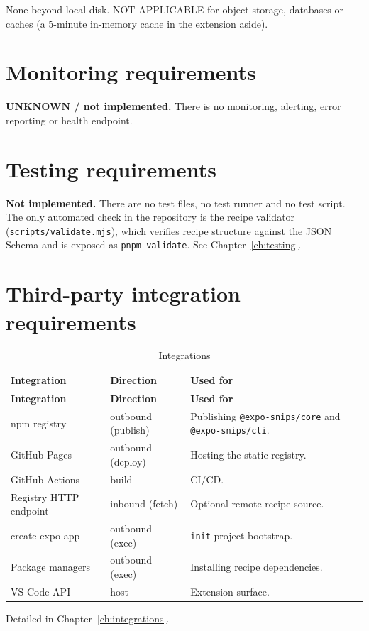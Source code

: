 None beyond local disk. NOT APPLICABLE for object storage, databases or caches
(a 5-minute in-memory cache in the extension aside).

\section{Monitoring requirements}

\textbf{UNKNOWN / not implemented.} There is no monitoring, alerting, error
reporting or health endpoint.

\section{Testing requirements}

\textbf{Not implemented.} There are no test files, no test runner and no test
script. The only automated check in the repository is the recipe validator
(\texttt{scripts/validate.mjs}), which verifies recipe structure against the JSON
Schema and is exposed as \texttt{pnpm validate}. See Chapter~\ref{ch:testing}.

\section{Third-party integration requirements}

\begin{longtable}{@{}L{4.4cm}L{5.2cm}L{4.8cm}@{}}
\caption{Integrations}\\
\toprule
\textbf{Integration} & \textbf{Direction} & \textbf{Used for} \\
\midrule
\endfirsthead
\toprule
\textbf{Integration} & \textbf{Direction} & \textbf{Used for} \\
\midrule
\endhead
npm registry & outbound (publish) & Publishing \texttt{@expo-snips/core} and \texttt{@expo-snips/cli}. \\
GitHub Pages & outbound (deploy) & Hosting the static registry. \\
GitHub Actions & build & CI/CD. \\
Registry HTTP endpoint & inbound (fetch) & Optional remote recipe source. \\
create-expo-app & outbound (exec) & \texttt{init} project bootstrap. \\
Package managers & outbound (exec) & Installing recipe dependencies. \\
VS Code API & host & Extension surface. \\
\bottomrule
\end{longtable}

Detailed in Chapter~\ref{ch:integrations}.
